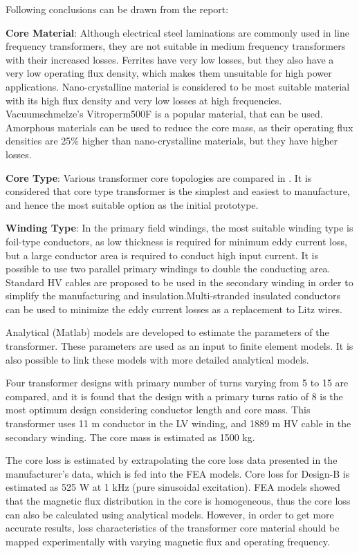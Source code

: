 \documentclass[a4paper, 11pt]{article} %
\begin{document}
Following conclusions can be drawn from the report:

\textbf{Core Material}: Although electrical steel laminations are commonly used in line frequency transformers, they are not suitable in medium frequency transformers with their increased losses. Ferrites have very low losses, but they also have a very low operating flux density, which makes them unsuitable for high power applications. Nano-crystalline material is considered to be most suitable material with its high flux density and very low losses at high frequencies. Vacuumschmelze's Vitroperm500F is a popular material, that can be used. Amorphous materials can be used to reduce the core mass, as their operating flux densities are 25\% higher than nano-crystalline materials, but they have higher losses.

\textbf{Core Type}: Various transformer core topologies are compared in \cite{Agheb2012}. It is considered that core type transformer is the simplest and easiest to manufacture, and hence the most suitable option as the initial prototype.

\textbf{Winding Type}: In the primary field windings, the most suitable winding type is foil-type conductors, as low thickness is required for minimum eddy current loss, but a large conductor area is required to conduct high input current. It is possible to use two parallel primary windings to double the conducting area. Standard HV cables are proposed to be used in the secondary winding in order to simplify the manufacturing and insulation.Multi-stranded insulated conductors can be used to minimize the eddy current losses as a replacement to Litz wires.

Analytical (Matlab) models are developed to estimate the parameters of the transformer. These parameters are used as an input to finite element models. It is also possible to link these models with more detailed analytical models.

Four transformer designs with primary number of turns varying from 5 to 15 are compared, and it is found that the design with a primary turns ratio of 8 is the most optimum design considering conductor length and core mass. This transformer uses 11 m conductor in the LV winding, and 1889 m HV cable in the secondary winding. The core mass is estimated as 1500 kg.

The core loss is estimated by extrapolating the core loss data presented in the manufacturer's data, which is fed into the FEA models. Core loss for Design-B is estimated as 525 W at 1 kHz (pure sinusoidal excitation). FEA models showed that the magnetic flux distribution in the core is homogeneous, thus the core loss can also be calculated using analytical models. However, in order to get more accurate results, loss characteristics of the transformer core material should be mapped experimentally with varying magnetic flux and operating frequency.
\end{document}
